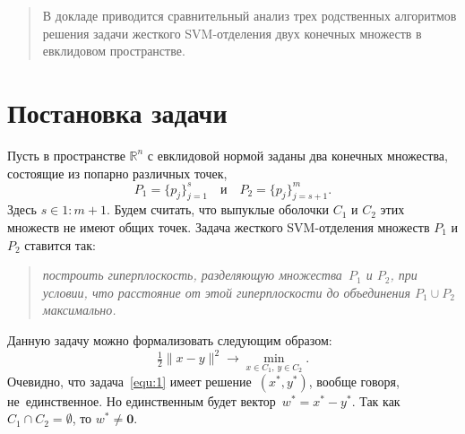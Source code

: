 
\maketitle

\begin{abstract}
В докладе приводится сравнительный анализ трех родственных алгоритмов решения задачи жесткого SVM-отделения двух конечных множеств в евклидовом пространстве.

\end{abstract}

\section{Постановка задачи} %

Пусть в пространстве $\mathbb{R}^n$ с евклидовой нормой заданы два конечных множества, состоящие из попарно различных точек,
$$
  P_1 = \bigl\{p_j\bigr\}_{j=1}^s \quad\text{и}\quad P_2 = \bigl\{p_j\bigr\}_{j=s+1}^m.
$$
Здесь $s\in 1:m+1$. Будем считать, что выпуклые оболочки $C_1$ и $C_2$ этих множеств не имеют общих точек. Задача жесткого SVM-отделения множеств $P_1$ и $P_2$ ставится так:
\begin{quote}
\textit{построить гиперплоскость, разделяющую множества~$P_1$ и $P_2$, при условии, что расстояние от этой гиперплоскости до объединения $P_1 \cup P_2$ максимально.}
\end{quote}

Данную задачу можно формализовать следующим образом:
\begin{equation}\label{equ:1}
  \tfrac12 \|x-y\|^2 \to \min_{x\in C_1,\, y\in C_2}.
\end{equation}
Очевидно, что задача~\eqref{equ:1} имеет решение~$(x^*,y^*)$, вообще говоря, не~единственное. Но единственным будет вектор~$w^*=x^*-y^*$. Так как $C_1 \cap C_2 = \emptyset$, то $w^*\neq \mathbf{0}$.


